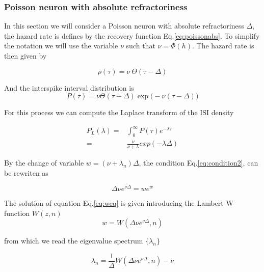 \documentclass[a4paper,11pt,twoside]{article}
\def \be {\begin{equation}}
\def \ee {\end{equation}}
\numberwithin{equation}{section}
\begin{document}
\subsubsection{Poisson neuron with absolute refractoriness}
\label{subsec:absref}


In this section we will consider a Poisson neuron with absolute refractoriness $\Delta$, the hazard rate is defines by the recovery function Eq.\eqref{eq:poissonabs}.
To simplify the notation we will use the variable $\nu$ such that $\nu=\Phi(h)$. The hazard rate is then given by

\begin{equation}
\rho(\tau)=\nu\:\Theta(\tau-\Delta)
\end{equation}


And the interspike interval distribution is 
\begin{equation}
P(\tau)=\nu \Theta(\tau-\Delta) \exp\big(-\nu(\tau-\Delta)\big)
\end{equation}



For this process we can compute the Laplace transform of the ISI density

\begin{align}
P_L(\lambda)=&\int_0^\infty P(\tau)e^{-\lambda \tau}\nonumber\\
=&\frac{\nu}{\nu+\lambda}exp(-\lambda \Delta)
\end{align}


By the change of variable $w=(\nu+\lambda_n)\Delta$, the condition Eq.\eqref{eq:condition2}, can be rewriten as


\begin{equation}
\label{eq:weq}
\Delta \nu e^{\nu\Delta}=we^{w} 
\end{equation}

The solution of equation Eq.\eqref{eq:weq} is given introducing the Lambert W-function $W(z,n)$
\begin{equation}
w=W(\Delta \nu e^{\nu\Delta},n)
\end{equation}

from which we read the eigenvalue spectrum $\{\lambda_n\}$

\begin{equation}
\lambda_n=\frac{1}{\Delta}W(\Delta \nu e^{\nu\Delta},n) - \nu
\end{equation}
\end{document}
